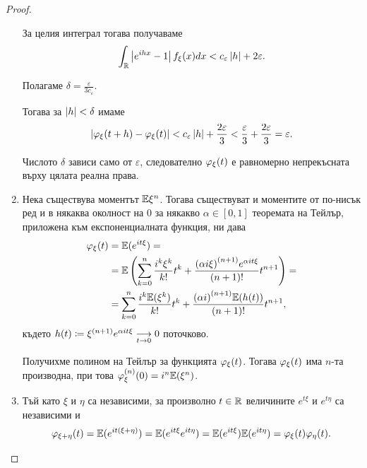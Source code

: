 \documentclass[numbers=endperiod, bibliography=totocnumbered]{scrartcl}
\begin{document}
\begin{proof}
\begin{enumerate}
    За целия интеграл тогава получаваме
    \begin{align*}
      \int_{\R} \Abs{e^{ihx} - 1} f_\xi(x) dx
      <
      c_\varepsilon \Abs{h} + 2 \varepsilon.
    \end{align*}

    Полагаме \( \delta = \frac \varepsilon {3 c_\varepsilon} \).

    Тогава за \( \Abs h < \delta \) имаме
    \begin{align*}
      \Abs{\Char_\xi(t + h) - \Char_\xi(t)}
      <
      c_\varepsilon \Abs{h} + \frac {2\varepsilon} 3
      <
      \frac {\varepsilon} 3 + \frac {2\varepsilon} 3
      =
      \varepsilon.
    \end{align*}

    Числото \( \delta \) зависи само от \( \varepsilon \), следователно \( \Char_\xi(t) \) е равномерно непрекъсната върху цялата реална права.

    \item Нека съществува моментът \( \Expect \xi^n \). Тогава съществуват и моментите от по-нисък ред и в някаква околност на \( 0 \) за някакво \( \alpha \in [0, 1] \) теоремата на Тейлър, приложена към експоненциалната функция, ни дава
    \begin{align*}
      \Char_\xi(t)
      &=
      \Expect(e^{it\xi})
      = \\ &=
      \Expect\left(\sum_{k=0}^n \frac {i^k \xi^k} {k!} t^k + \frac {{(\alpha i \xi)}^{(n+1)} e^{\alpha it \xi}} {(n+1)!} t^{n+1} \right)
      = \\ &=
      \sum_{k=0}^n \frac {i^k \Expect(\xi^k)} {k!} t^k + \frac {{(\alpha i)}^{(n+1)} \Expect(h(t))} {(n+1)!} t^{n+1},
    \end{align*}
    където \( h(t) \coloneqq \xi^{(n+1)} e^{\alpha it \xi} \Conv[t \to 0]{} 0 \) поточково.

    Получихме полином на Тейлър за функцията \( \Char_\xi(t) \). Тогава \( \Char_\xi(t) \) има \( n \)-та производна, при това \( \Char^{(n)}_\xi(0) = i^n \Expect(\xi^n) \).

    \item Тъй като \( \xi \) и \( \eta \) са независими, за произволно \( t \in \R \) величините \( e^{t\xi} \) и \( e^{t\eta} \) са независими и
    \begin{align*}
      \Char_{\xi + \eta}(t)
      =
      \Expect(e^{it(\xi + \eta)})
      =
      \Expect(e^{it\xi} e^{it\eta})
      =
      \Expect(e^{it\xi}) \Expect(e^{it\eta})
      =
      \Char_\xi(t) \Char_\eta(t).
    \end{align*}


\end{enumerate}
\end{proof}
\end{document}

